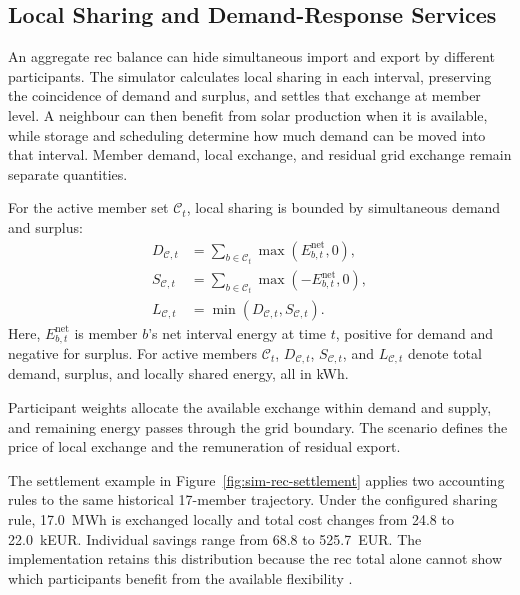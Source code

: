 \subsection{Local Sharing and Demand-Response Services}

An aggregate \gls{rec} balance can hide simultaneous import and export by different participants. The simulator calculates local sharing in each interval, preserving the coincidence of demand and surplus, and settles that exchange at member level. A neighbour can then benefit from solar production when it is available, while storage and scheduling determine how much demand can be moved into that interval. Member demand, local exchange, and residual grid exchange remain separate quantities.

\begin{samepage}
For the active member set $\mathcal{C}_t$, local sharing is bounded by simultaneous demand and surplus:
\begin{equation}
\begin{aligned}
D_{\mathcal{C},t}&=\sum_{b\in\mathcal{C}_t}\max(E^{\mathrm{net}}_{b,t},0),\\
S_{\mathcal{C},t}&=\sum_{b\in\mathcal{C}_t}\max(-E^{\mathrm{net}}_{b,t},0),\\
L_{\mathcal{C},t}&=\min(D_{\mathcal{C},t},S_{\mathcal{C},t}).
\end{aligned}
\label{eq:sim-local-sharing}
\end{equation}
Here, $E^{\mathrm{net}}_{b,t}$ is member $b$'s net interval energy at time $t$, positive for demand and negative for surplus. For active members $\mathcal{C}_t$, $D_{\mathcal{C},t}$, $S_{\mathcal{C},t}$, and $L_{\mathcal{C},t}$ denote total demand, surplus, and locally shared energy, all in kWh.\par
\end{samepage}

Participant weights allocate the available exchange within demand and supply, and remaining energy passes through the grid boundary. The scenario defines the price of local exchange and the remuneration of residual export.

The settlement example in Figure~\ref{fig:sim-rec-settlement} applies two accounting rules to the same historical 17-member trajectory. Under the configured sharing rule, 17.0~MWh is exchanged locally and total cost changes from 24.8 to 22.0~kEUR. Individual savings range from 68.8 to 525.7~EUR. The implementation retains this distribution because the \gls{rec} total alone cannot show which participants benefit from the available flexibility \parencite{fonseca2026citylearnv3}.

